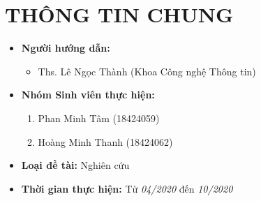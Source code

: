 \documentclass{article}[14pt]
\begin{document}
    \section{THÔNG TIN CHUNG}
    \begin{itemize}[label = {}]
        
        \item \textbf{Người hướng dẫn:} 
        \begin{itemize}
            \item Ths. Lê Ngọc Thành (Khoa Công nghệ Thông tin)
        \end{itemize}{}
    
        
        \item \textbf{Nhóm Sinh viên thực hiện:}
        
        \begin{enumerate}
        
            \item Phan Minh Tâm (18424059)
            \item Hoàng Minh Thanh (18424062)
        \end{enumerate}

        \item \textbf{Loại đề tài:} Nghiên cứu
        
        \item \textbf{Thời gian thực hiện:} Từ \textit{04/2020} đến \textit{10/2020}
        
        
    \end{itemize}
    
\end{document}
